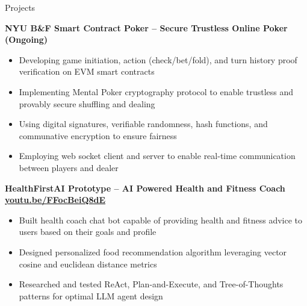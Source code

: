 \documentclass{resume} %
\begin{document}
\begin{rSection}{Projects}

	\textbf{NYU B\&F Smart Contract Poker – Secure Trustless Online Poker (Ongoing)}
	\begin{itemize}
		\item Developing game initiation, action (check/bet/fold), and turn history proof verification on EVM smart contracts
		\item Implementing Mental Poker cryptography protocol to enable trustless and  provably secure shuffling and dealing
		\item Using digital signatures, verifiable randomness, hash functions, and communative encryption to ensure fairness
		\item Employing web socket client and server to enable real-time communication between players and dealer
	\end{itemize}

	\textbf{HealthFirstAI Prototype – AI Powered Health and Fitness Coach \href{https://youtu.be/FFocBeiQ8dE}{youtu.be/FFocBeiQ8dE}}
	\begin{itemize}
		\item Built health coach chat bot capable of providing health and fitness advice to users based on their goals and profile
		\item Designed personalized food recommendation algorithm leveraging vector cosine and euclidean distance metrics
		\item Researched and tested ReAct, Plan-and-Execute, and Tree-of-Thoughts patterns for optimal LLM agent design
	\end{itemize}



\end{rSection}
\end{document}
